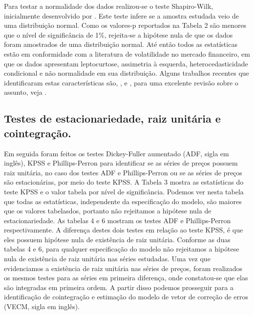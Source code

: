 Para testar a normalidade dos dados realizou-se o teste Shapiro-Wilk,
inicialmente desenvolvido por . Este teste infere
se a amostra estudada veio de uma distribuição normal. Como os valores-p
reportados na Tabela 2 são menores que o nível de significância de 1\%,
rejeita-se a hipótese nula de que os dados foram amostrados de uma
distribuição normal. Até então todos as estatísticas estão em
conformidade com a literatura de volatilidade no mercado financeiro, em
que os dados apresentam leptocurtose, assimetria à esquerda,
heterocedasticidade condicional e não normalidade em sua distribuição.
Alguns trabalhos recentes que identificaram estas características são,
,  e , para uma excelente revisão sobre o assunto, veja .

\subsection{Testes de estacionariedade, raiz unitária e
cointegração.}\label{testes-de-estacionariedade-raiz-unitaria-e-cointegracao.}

Em seguida foram feitos os testes Dickey-Fuller aumentado (ADF, sigla em
inglês), KPSS e Phillips-Perron para identificar se as séries de preços
possuem raiz unitária, no caso dos testes ADF e Phillips-Perron ou se as
séries de preços são estacionárias, por meio do teste KPSS. A Tabela 3
mostra as estatísticas do teste KPSS e o valor tabela por nível de
significância. Podemos ver nesta tabela que todas as estatísticas,
independente da especificação do modelo, são maiores que os valores
tabelasdos, portanto não rejeitamos a hipótese nula de estacionariedade.
As tabelas 4 e 6 mostram os testes ADF e Phillips-Perron
respectivamente. A diferença destes dois testes em relação ao teste
KPSS, é que eles possuem hipótese nula de existência de raiz unitária.
Conforme as duas tabelas 4 e 6, para qualquer especificação do modelo não
rejeitamos a hipótese nula de existência de raiz unitária nas séries
estudadas. Uma vez que evidenciamos a existência de raiz unitária nas
séries de preços, foram realizados os mesmos testes para as séries em
primeira diferença, onde constatou-se que elas são integradas em
primeira ordem. A partir disso podemos prosseguir para a identificação
de cointegração e estimação do modelo de vetor de correção de erros
(VECM, sigla em inglês).

